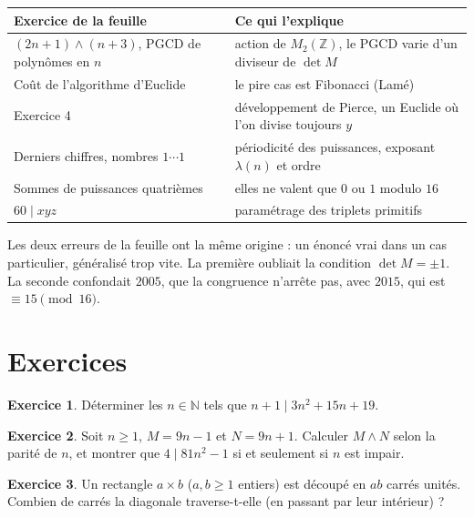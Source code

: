 \documentclass[11pt,a4paper]{article}
\theoremstyle{plain}
\theoremstyle{definition}
\newtheorem{exercice}{Exercice}
\theoremstyle{remark}
\newcommand{\N}{\mathbb{N}}
\newcommand{\Z}{\mathbb{Z}}
\newcommand{\pgcd}{\wedge}
\begin{document}
\begin{center}
\renewcommand{\arraystretch}{1.25}
\begin{tabular}{@{}p{5.2cm}p{8.4cm}@{}}
\toprule
\textbf{Exercice de la feuille} & \textbf{Ce qui l'explique} \\
\midrule
$(2n+1)\pgcd(n+3)$, PGCD de polynômes en $n$ & action de $M_2(\Z)$, le PGCD varie d'un diviseur de $\det M$ \\
Coût de l'algorithme d'Euclide & le pire cas est Fibonacci (Lamé) \\
Exercice 4 & développement de Pierce, un Euclide où l'on divise toujours $y$ \\
Derniers chiffres, nombres $1\cdots1$ & périodicité des puissances, exposant $\lambda(n)$ et ordre \\
Sommes de puissances quatrièmes & elles ne valent que $0$ ou $1$ modulo $16$ \\
$60\mid xyz$ & paramétrage des triplets primitifs \\
\bottomrule
\end{tabular}
\end{center}

Les deux erreurs de la feuille ont la même origine : un énoncé vrai dans un cas particulier, généralisé trop vite. La première oubliait la condition $\det M=\pm1$. La seconde confondait $2005$, que la congruence n'arrête pas, avec $2015$, qui est $\equiv15\pmod{16}$.

\section{Exercices}

\begin{exercice}
Déterminer les $n\in\N$ tels que $n+1\mid 3n^2+15n+19$.
\end{exercice}

\begin{exercice}
Soit $n\geq1$, $M=9n-1$ et $N=9n+1$. Calculer $M\pgcd N$ selon la parité de $n$, et montrer que $4\mid 81n^2-1$ si et seulement si $n$ est impair.
\end{exercice}

\begin{exercice}
Un rectangle $a\times b$ ($a,b\geq1$ entiers) est découpé en $ab$ carrés unités. Combien de carrés la diagonale traverse-t-elle (en passant par leur intérieur) ?
\end{exercice}
\end{document}
